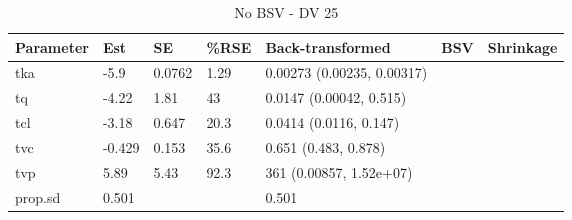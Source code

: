 \begin{table}
\centering\centering
\caption{No BSV - DV 25}
\centering
\fontsize{8}{10}\selectfont
\begin{tabular}[t]{lllllll}
\toprule
\textbf{Parameter} & \textbf{Est} & \textbf{SE} & \textbf{\%RSE} & \textbf{Back-transformed} & \textbf{BSV} & \textbf{Shrinkage}\\
\midrule
tka & -5.9 & 0.0762 & 1.29 & 0.00273 (0.00235, 0.00317) &  & \\
\midrule
tq & -4.22 & 1.81 & 43 & 0.0147 (0.00042, 0.515) &  & \\
\midrule
tcl & -3.18 & 0.647 & 20.3 & 0.0414 (0.0116, 0.147) &  & \\
\midrule
tvc & -0.429 & 0.153 & 35.6 & 0.651 (0.483, 0.878) &  & \\
\midrule
tvp & 5.89 & 5.43 & 92.3 & 361 (0.00857, 1.52e+07) &  & \\
\midrule
prop.sd & 0.501 &  &  & 0.501 &  & \\
\bottomrule
\end{tabular}
\end{table}